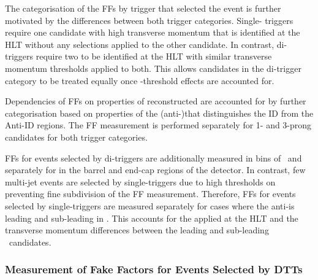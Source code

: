 The categorisation of the FFs by trigger that selected the event is further
motivated by the differences between both trigger categories. Single-\tauhadvis
triggers require one \tauhadvis candidate with high transverse momentum that is
identified at the HLT without any selections applied to the other candidate. In
contrast, di-\tauhadvis triggers require two \tauhadvis to be identified at the
HLT with similar transverse momentum thresholds applied to both. This allows
\tauhadvis candidates in the di-\tauhadvis trigger category to be treated
equally once \pT-threshold effects are accounted for. %

Dependencies of FFs on properties of reconstructed \tauhadvis are accounted for
by further categorisation based on properties of the (anti-)\tauhadvis that
distinguishes the ID from the Anti-ID regions. The FF measurement is performed
separately for 1- and 3-prong \tauhadvis candidates for both trigger categories.

FFs for events selected by di-\tauhadvis triggers are additionally measured in
bins of \tauhadvis~\pT and separately for \tauhadvis in the barrel and end-cap
regions of the detector. In contrast, few multi-jet events are selected by
single-\tauhadvis triggers due to high \pT thresholds on \tauhadvis preventing
fine subdivision of the FF measurement. Therefore, FFs for events selected by
single-\tauhadvis triggers are measured separately for cases where the
anti-\tauhadvis is leading and sub-leading in \pT. This accounts for the \tauid
applied at the HLT and the transverse momentum differences between the leading
and sub-leading \tauhadvis~candidates.


\subsubsection{Measurement of Fake Factors for Events Selected by DTTs}

